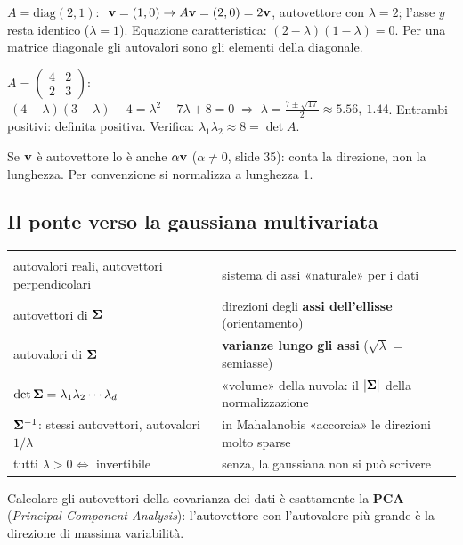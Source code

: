 \begin{esempio}
$A=\mathrm{diag}(2,1)$: $\ \mathbf{v}=(1,0)\to A\mathbf{v}=(2,0)=2\mathbf{v}$, autovettore con $\lambda=2$; l'asse $y$ resta identico ($\lambda=1$). Equazione caratteristica: $(2-\lambda)(1-\lambda)=0$. Per una matrice diagonale gli autovalori sono gli elementi della diagonale.

$A=\begin{pmatrix}4&2\\2&3\end{pmatrix}$: $\ (4-\lambda)(3-\lambda)-4=\lambda^2-7\lambda+8=0\;\Rightarrow\;\lambda=\frac{7\pm\sqrt{17}}2\approx5.56,\ 1.44$. Entrambi positivi: definita positiva. Verifica: $\lambda_1\lambda_2\approx8=\det A$.
\end{esempio}
Se $\mathbf{v}$ è autovettore lo è anche $\alpha\mathbf{v}$ ($\alpha\neq0$, slide 35): conta la direzione, non la lunghezza. Per convenzione si normalizza a lunghezza 1.

\subsection{Il ponte verso la gaussiana multivariata}
\begin{center}
\begin{tabularx}{\linewidth}{>{\raggedright\arraybackslash}p{5.6cm} Y}
 & \\
autovalori reali, autovettori perpendicolari & sistema di assi «naturale» per i dati\\
autovettori di $\bm{\Sigma}$ & direzioni degli \textbf{assi dell'ellisse} (orientamento)\\
autovalori di $\bm{\Sigma}$ & \textbf{varianze lungo gli assi} ($\sqrt\lambda$ = semiasse)\\
$\det\bm{\Sigma}=\lambda_1\lambda_2\cdots\lambda_d$ & «volume» della nuvola: il $|\bm{\Sigma}|$ della normalizzazione\\
$\bm{\Sigma}^{-1}$: stessi autovettori, autovalori $1/\lambda$ & in Mahalanobis «accorcia» le direzioni molto sparse\\
tutti $\lambda>0\iff$ invertibile & senza, la gaussiana non si può scrivere\\
\end{tabularx}
\end{center}
\begin{mlbox}
Calcolare gli autovettori della covarianza dei dati è esattamente la \textbf{PCA} (\emph{Principal Component Analysis}): l'autovettore con l'autovalore più grande è la direzione di massima variabilità.
\end{mlbox}

